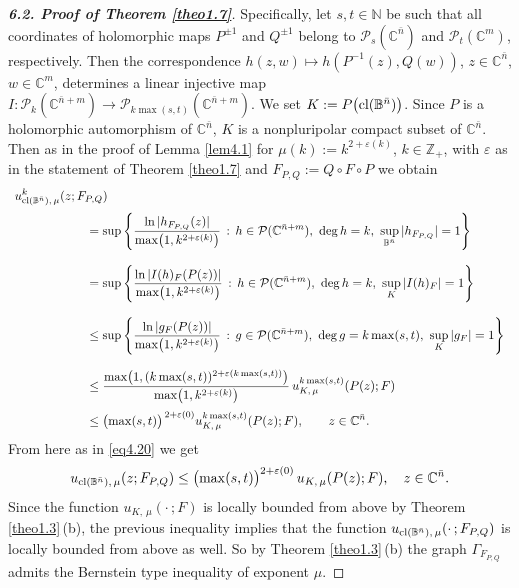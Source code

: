 \documentclass[11pt, oneside]{amsart}
\begin{document}
\begin{proof}[{\bf 6.2. Proof of Theorem \ref{theo1.7}}]
Specifically, let
$s,t\in\mathbb N$ be such that all coordinates of holomorphic maps $P^{\pm 1}$ and $Q^{\pm 1}$ belong to $\mathcal P_s(\mathbb C^{\bar n})$ and $\mathcal P_t(\mathbb C^m)$, respectively. Then the correspondence $h(z,w)\mapsto h(P^{-1}(z),Q(w))$, $z\in\mathbb C^{\bar n}$, $w\in\mathbb C^m$, determines a linear injective map 
$I:\mathcal P_k(\mathbb C^{\bar n+m})\rightarrow \mathcal P_{k\max(s,t)}(\mathbb C^{\bar n+m})$.
We set
$K:=P\bigl({\rm cl}(\mathbb B^{\bar n})\bigr)$.
Since $P$ is a holomorphic automorphism of $\mathbb C^{\bar n}$, $K$ is a nonpluripolar compact subset of $\mathbb C^{\bar n}$. Then as in the proof of Lemma \ref{lem4.1}  for $\mu(k):=k^{2+\varepsilon(k)}$, $k\in\mathbb Z_+$, with $\varepsilon$  as in the statement of Theorem \ref{theo1.7} and $F_{P,Q}:=Q\circ F\circ P$ we obtain\smallskip
\[
\begin{array}{lr}
\displaystyle
 u^{k}_{{\rm cl}(\mathbb B^{\bar n}),\,\mu}(z;F_{P,Q})\medskip \\
\displaystyle \qquad\qquad\qquad =
\sup\left\{\frac{\ln |h_{F_{P,Q}}(z)|}{\max\bigl(1,k^{2+\varepsilon(k)}\bigr)}\, :\, h\in\mathcal P(\mathbb C^{\bar n+m}),\ {\rm deg}\,h= k,\ \sup_{\mathbb B^{\bar n}}|h_{F_{P,Q}}|=1\right\}\\
\\
\displaystyle \qquad\qquad\qquad =\sup\left\{\frac{\ln |I(h)_{F}(P(z))|}{\max\bigl(1,k^{2+\varepsilon(k)}\bigr)}\, :\, h\in\mathcal P(\mathbb C^{\bar n+m}),\ {\rm deg}\,h= k,\ \sup_{K}|I(h)_{F}|=1\right\}\\
\\
\displaystyle \qquad\qquad\qquad \le \sup\left\{\frac{\ln |g_{F}(P(z))|}{\max\bigl(1,k^{2+\varepsilon(k)}\bigr)}\, :\, g\in\mathcal P(\mathbb C^{\bar n+m}),\ {\rm deg}\,g= k\max(s,t),\ \sup_{K}|g_{F}|=1\right\}\\
\\
\displaystyle \qquad\qquad\qquad\le\frac{\max\bigl(1, (k\max(s,t))^{2+\varepsilon(k\max(s,t))}\bigr)}{\max\bigl(1,k^{2+\varepsilon(k)}\bigr)}\, u_{K,\,\mu}^{k\max(s,t)}(P(z);F)\medskip\\
\displaystyle \qquad\qquad\qquad\le \bigl(\max(s,t)\bigr)^{\, 2+\varepsilon(0)} u_{K,\,\mu}^{k\max(s,t)}(P(z);F),\qquad z\in\mathbb C^{\bar n}.
\end{array}
\]
From here as in \eqref{eq4.20} we get
\[
u_{{\rm cl}(\mathbb B^{\bar n}),\,\mu}(z;F_{P,Q})\le
\bigl(\max(s,t)\bigr)^{2+\varepsilon(0)}\, u_{K,\,\mu} (P(z);F),\quad z\in\mathbb C^{\bar n}.
\]
Since the function  $u_{K,\,\mu}(\cdot\, ; F)$ is locally bounded from above by Theorem \ref{theo1.3}\,(b),  the previous inequality implies that the function $u_{{\rm cl}(\mathbb B^{\bar n}),\,\mu}(\cdot\, ;F_{P,Q})$ is locally bounded from above as well. So by Theorem \ref{theo1.3}\,(b) the graph $\Gamma_{F_{P,Q}}$ admits the Bernstein type inequality of exponent $\mu$. 


\end{proof}
\end{document}
